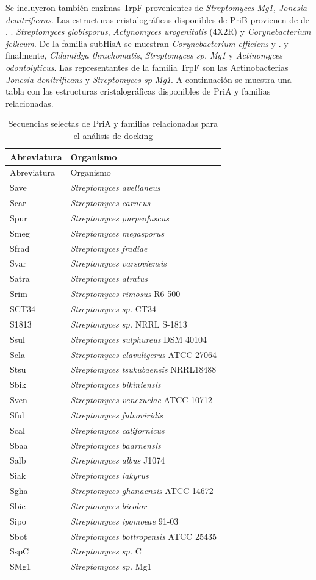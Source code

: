 \documentclass[12pt,twoside]{reedthesis}
\begin{document}
  Se incluyeron también enzimas TrpF provenientes de \emph{Streptomyces
  Mg1, Jonesia denitrificans}. Las estructuras cristalográficas
  disponibles de PriB provienen de de . . \emph{Streptomyces globisporus},
  \emph{Actynomyces urogenitalis} (4X2R) y \emph{Corynebacterium jeikeum}.
  De la familia subHisA se muestran \emph{Corynebacterium efficiens} y . y
  finalmente, \emph{Chlamidya thrachomatis}, \emph{Streptomyces sp. Mg1} y
  \emph{Actinomyces odontolyticus}. Las representantes de la familia TrpF
  son las Actinobacterias \emph{Jonesia denitrificans} y
  \emph{Streptomyces sp Mg1}. A continuación se muestra una tabla con las
  estructuras cristalográficas disponibles de PriA y familias
  relacionadas.
  
  \begin{longtable}[]{@{}ll@{}}
  \caption{Secuencias selectas de PriA y familias relacionadas para el
  análisis de docking \label{tab:EnzymeDocking}}\tabularnewline
  \toprule
  Abreviatura & Organismo\tabularnewline
  \midrule
  \endfirsthead
  \toprule
  Abreviatura & Organismo\tabularnewline
  \midrule
  \endhead
  Save & \emph{Streptomyces avellaneus}\tabularnewline
  Scar & \emph{Streptomyces carneus}\tabularnewline
  Spur & \emph{Streptomyces purpeofuscus}\tabularnewline
  Smeg & \emph{Streptomyces megasporus}\tabularnewline
  Sfrad & \emph{Streptomyces fradiae}\tabularnewline
  Svar & \emph{Streptomyces varsoviensis}\tabularnewline
  Satra & \emph{Streptomyces atratus}\tabularnewline
  Srim & \emph{Streptomyces rimosus} R6-500\tabularnewline
  SCT34 & \emph{Streptomyces sp.} CT34\tabularnewline
  S1813 & \emph{Streptomyces sp.} NRRL S-1813\tabularnewline
  Ssul & \emph{Streptomyces sulphureus} DSM 40104\tabularnewline
  Scla & \emph{Streptomyces clavuligerus} ATCC 27064\tabularnewline
  Stsu & \emph{Streptomyces tsukubaensis} NRRL18488\tabularnewline
  Sbik & \emph{Streptomyces bikiniensis}\tabularnewline
  Sven & \emph{Streptomyces venezuelae} ATCC 10712\tabularnewline
  Sful & \emph{Streptomyces fulvoviridis}\tabularnewline
  Scal & \emph{Streptomyces californicus}\tabularnewline
  Sbaa & \emph{Streptomyces baarnensis}\tabularnewline
  Salb & \emph{Streptomyces albus} J1074\tabularnewline
  Siak & \emph{Streptomyces iakyrus}\tabularnewline
  Sgha & \emph{Streptomyces ghanaensis} ATCC 14672\tabularnewline
  Sbic & \emph{Streptomyces bicolor}\tabularnewline
  Sipo & \emph{Streptomyces ipomoeae} 91-03\tabularnewline
  Sbot & \emph{Streptomyces bottropensis} ATCC 25435\tabularnewline
  SspC & \emph{Streptomyces sp.} C\tabularnewline
  SMg1 & \emph{Streptomyces sp.} Mg1\tabularnewline

\end{longtable}
\end{document}
